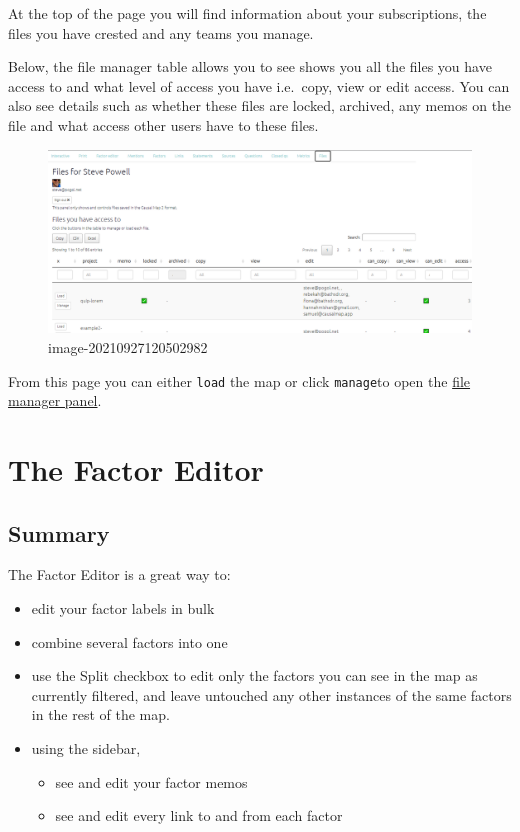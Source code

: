\documentclass[
]{book}
\providecommand{\tightlist}{%
  \setlength{\itemsep}{0pt}\setlength{\parskip}{0pt}}
\begin{document}
At the top of the page you will find information about your subscriptions, the files you have crested and any teams you manage.

Below, the file manager table allows you to see shows you all the files you have access to and what level of access you have i.e.~copy, view or edit access. You can also see details such as whether these files are locked, archived, any memos on the file and what access other users have to these files.

\begin{figure}
\centering
\includegraphics[width=6.77083in,height=\textheight]{_assets/image-20210927120502982.png}
\caption{image-20210927120502982}
\end{figure}

From this page you can either \texttt{load} the map or click \texttt{manage}to open the \protect\hyperlink{xpermissions}{file manager panel}.

\hypertarget{xfactor-editor}{%
\chapter{The Factor Editor}\label{xfactor-editor}}

\hypertarget{summary}{%
\section{Summary}\label{summary}}

The Factor Editor is a great way to:

\begin{itemize}
\tightlist
\item
  edit your factor labels in bulk
\item
  combine several factors into one
\item
  use the Split checkbox to edit only the factors you can see in the map as currently filtered, and leave untouched any other instances of the same factors in the rest of the map.
\item
  using the sidebar,

  \begin{itemize}
  \tightlist
  \item
    see and edit your factor memos
  \item
    see and edit every link to and from each factor
  \end{itemize}
\end{itemize}
\end{document}
